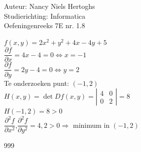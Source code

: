 \documentclass[a4paper]{article}
\begin{document}
  
\noindent \large Auteur: Nancy Niels Hertoghs \\
\noindent \large Studierichting: Informatica\\
\noindent \large Oefeningenreeks 7E nr. 1.8\\

\medskip

\normalsize

$f(x,y) = 2x^2 +y^2 +4x -4y +5$\\

$\dfrac{\partial f}{\partial x} = 4x -4 =0 \Leftrightarrow x=-1$\\

$\dfrac{\partial f}{\partial y}= 2y -4= 0 \Leftrightarrow y=2$\\

Te onderzoeken punt: $(-1,2)$\\

$H(x,y) = \det Df(x,y) = \left|\begin{array}{cc}
	4 & 0 \\
	0 & 2 
\end{array}\right| = 8$\\

$H(-1,2)= 8 > 0$ \\

$\dfrac{\partial^2 f}{\partial x^2}$,$\dfrac{\partial^2 f}{\partial y^2} = 4,2 > 0 \Rightarrow $ minimum in $(-1,2)$\\

\begin{thebibliography}{999}
\end{thebibliography}
\end{document}
